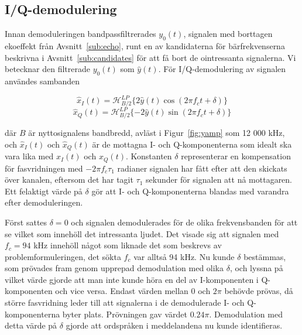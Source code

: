\documentclass[10pt,twocolumn]{article}
\begin{document}
% 

\subsection{I/Q-demodulering\label{sub:iq}}
Innan demoduleringen bandpassfiltrerades $y_0(t)$, signalen med borttagen
ekoeffekt från Avsnitt~\ref{sub:echo}, runt en av kandidaterna
för bärfrekvenserna beskrivna i Avsnitt~\ref{sub:candidates} för att få bort de
ointressanta signalerna. Vi betecknar den filtrerade $y_0(t)$ som $\hat{y}(t)$.
För I/Q-demodulering av signalen användes sambanden

\begin{equation*}
    \hat{x}_I(t) = \mathcal{H}_{B/2}^{LP}\{2\hat{y}(t)\cos(2\pi f_c t + \delta)\}
\end{equation*}
\begin{equation*}
    \hat{x}_Q(t) = \mathcal{H}_{B/2}^{LP}\{-2\hat{y}(t)\sin(2\pi f_c t + \delta)\}
\end{equation*}

där $B$ är nyttosignalens bandbredd, avläst i Figur~\ref{fig:yamp} som 12 000
kHz, och
$\hat{x}_I(t)$ och $\hat{x}_Q(t)$ är de mottagna I- och Q-komponenterna som
idealt ska vara lika med $x_I(t)$ och $x_Q(t)$.
Konstanten $\delta$ representerar en kompensation för fasvridningen med 
$-2\pi f_c \tau_1$ radianer signalen har fått efter
att den skickats över kanalen, eftersom det har tagit $\tau_1$ sekunder för
signalen att nå mottagaren. Ett felaktigt värde på $\delta$ gör att
I- och Q-komponenterna blandas med varandra efter demoduleringen.

Först sattes $\delta = 0$ och signalen demodulerades för de olika
frekvensbanden för att se vilket som innehöll det intressanta ljudet. Det
visade sig att signalen med $f_c = 94$ kHz innehöll något som liknade det som
beskrevs av problemformuleringen, det sökta $f_c$ var alltså 94 kHz.
Nu kunde $\delta$ bestämmas, som prövades fram genom upprepad demodulation med olika $\delta$, och
lyssna på vilket värde gjorde att man inte kunde höra en del av I-komponenten i
Q-komponenten och vice versa. Endast värden mellan 0 och $2\pi$ behövde prövas,
då större fasvridning leder till att signalerna i de demodulerade I- och Q-komponenterna byter plats.
Prövningen gav värdet $0.24\pi$. Demodulation med detta värde på $\delta$ gjorde
att ordspråken i meddelandena nu kunde identifieras.
\end{document}
